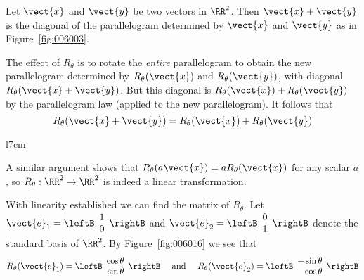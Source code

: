 \smallskip


Let $\vect{x}$ and $\vect{y}$ be two vectors in $\RR^2$. Then $\vect{x} + \vect{y}$ is the diagonal of the parallelogram determined by $\vect{x}$ and $\vect{y}$ as in Figure~\ref{fig:006003}. 

\noindent The effect of $R_{\theta}$ is to rotate the \textit{entire} parallelogram to obtain the new parallelogram determined by $R_{\theta}(\vect{x})$ and $R_{\theta}(\vect{y})$, with diagonal $R_{\theta}(\vect{x} + \vect{y})$. But this diagonal is $R_{\theta}(\vect{x}) + R_{\theta}(\vect{y})$ by the parallelogram law (applied to the new parallelogram). It follows that
\begin{equation*}
R_{\theta}(\vect{x} + \vect{y}) = R_{\theta}(\vect{x}) + R_{\theta}(\vect{y})
\end{equation*}

\begin{wrapfigure}{l}{7cm} 
\vspace*{-2em}
\centering

\caption{\label{fig:006016}}
\end{wrapfigure}

A similar argument shows that $R_{\theta}(a\vect{x}) = aR_{\theta}(\vect{x})$ for any scalar $a$, so $R_{\theta} : \RR^2 \to \RR^2$ is indeed a linear transformation.

With linearity established we can find the matrix of $R_{\theta}$. Let $\vect{e}_{1} = \leftB \begin{array}{c}
1 \\
0
\end{array} \rightB$
 and $\vect{e}_{2} = \leftB \begin{array}{c}
 0 \\
 1
 \end{array} \rightB$
 denote the standard basis of $\RR^2$. By Figure~\ref{fig:006016} we see that
\begin{equation*}
R_{\theta}(\vect{e}_{1}) = \leftB \begin{array}{r}
\cos \theta \\
\sin \theta
\end{array} \rightB \quad \mbox{ and } \quad 
R_{\theta}(\vect{e}_{2}) = \leftB \begin{array}{r}
-\sin \theta \\
\cos \theta
\end{array} \rightB
\end{equation*}

\medskip

